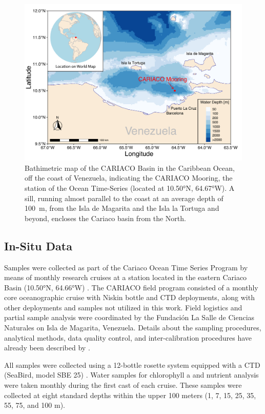 \documentclass[draft]{agujournal2019}
\begin{document}
\begin{figure}
\noindent\includegraphics[width=\textwidth]{fig/Map_CAR.pdf}
\caption{Bathimetric map of the CARIACO Basin in the Caribbean Ocean, off the coast of Venezuela, indicating the CARIACO Mooring, the station of the Ocean Time-Series (located at \ang{10.50}N, \ang{64.67}W). A sill, running almost parallel to the coast at an average depth of \qty{100}{m}, from the Isla de Magarita and the Isla la Tortuga and beyond, encloses the Cariaco basin from the North.}
\label{fig:map}
\end{figure}


\subsection{In-Situ Data}
    Samples were collected as part of the Cariaco Ocean Time Series Program by means of monthly research cruises at a station located in the eastern Cariaco Basin (\ang{10.50}N, \ang{64.66}W) \cite{muller-karger_scientific_2019}.
    The CARIACO field program consisted of a monthly core oceanographic cruise with Niskin bottle and CTD deployments, along with other deployments and samples not utilized in this work. Field logistics and partial sample analysis were coordinated by the Fundación La Salle de Ciencias Naturales on Isla de Magarita, Venezuela. Details about the sampling procedures, analytical methods, data quality control, and inter-calibration procedures have already been described by . 
    
    All samples were collected using a 12-bottle rosette system equipped with a CTD (SeaBird, model SBE 25) \cite{astor_yrene_m_handbook_2013}. Water samples for chlorophyll a and nutrient analysis were taken monthly during the first cast of each cruise. These samples were collected at eight standard depths within the upper 100 meters (1, 7, 15, 25, 35, 55, 75, and 100 m). 
\end{document}
